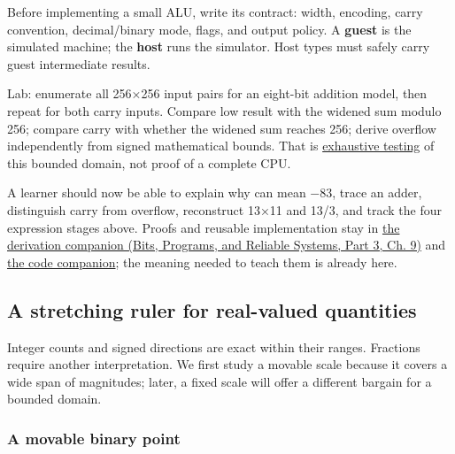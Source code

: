 \hypertarget{01-foundations-i-ch001-integer-laboratory-and-teaching-checkpoint}{}

Before implementing a small ALU, write its contract: width, encoding, carry convention, decimal/binary mode, flags, and output policy. A \textbf{guest} is the simulated machine; the \textbf{host} runs the simulator. Host types must safely carry guest intermediate results.

Lab: enumerate all 256×256 input pairs for an eight-bit addition model, then repeat for both carry inputs. Compare low result with the widened sum modulo 256; compare carry with whether the widened sum reaches 256; derive overflow independently from signed mathematical bounds. That is \hyperref[appendix-05db24ccc28a]{exhaustive testing} of this bounded domain, not proof of a complete CPU.

A learner should now be able to explain why  can mean −83, trace an adder, distinguish carry from overflow, reconstruct 13×11 and 13/3, and track the four expression stages above. Proofs and reusable implementation stay in \href{../01-Bits-Programs-and-Reliable-Systems-P03/main.pdf\#nameddest=01-foundations-i-ch011-m002---signed-representations-adders-and-arithmetic-policies}{the derivation companion (Bits, Programs, and Reliable Systems, Part 3, Ch. 9)} and \hyperref[appendix-4e2236f53445-m002---exhaustive-8-bit-addition-oracle-and-saturation]{the code companion}; the meaning needed to teach them is already here.

\subsection{A stretching ruler for real-valued quantities}\label{01-foundations-i-ch001-a-stretching-ruler-for-real-valued-quantities}

\hypertarget{01-foundations-i-ch001-a-stretching-ruler-for-real-valued-quantities}{}

Integer counts and signed directions are exact within their ranges. Fractions require another interpretation. We first study a movable scale because it covers a wide span of magnitudes; later, a fixed scale will offer a different bargain for a bounded domain.

\subsubsection{A movable binary point}\label{01-foundations-i-ch001-a-movable-binary-point}

